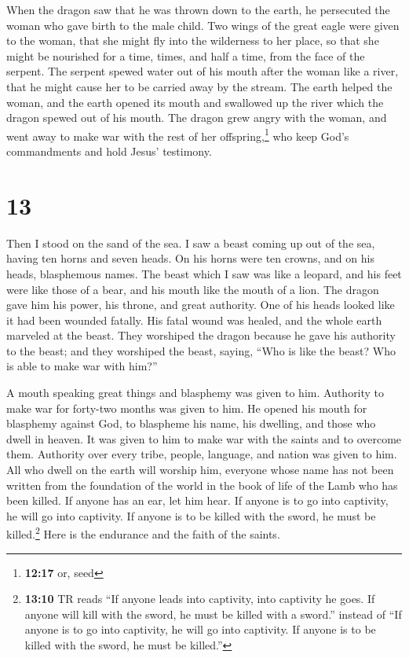  When the dragon saw that he was thrown down to the
earth, he persecuted the woman who gave birth to the male child.
 Two wings of the great eagle were given to the woman,
that she might fly into the wilderness to her place, so that she might
be nourished for a time, times, and half a time, from the face of the
serpent.  The serpent spewed water out of his mouth after
the woman like a river, that he might cause her to be carried away by
the stream.  The earth helped the woman, and the earth
opened its mouth and swallowed up the river which the dragon spewed out
of his mouth.  The dragon grew angry with the woman, and
went away to make war with the rest of her offspring,\footnote{\textbf{12:17}
  or, seed} who keep God's commandments and hold Jesus' testimony.

\hypertarget{section-12}{%
\section{13}\label{section-12}}

 Then I stood on the sand of the sea. I saw a beast coming
up out of the sea, having ten horns and seven heads. On his horns were
ten crowns, and on his heads, blasphemous names.  The
beast which I saw was like a leopard, and his feet were like those of a
bear, and his mouth like the mouth of a lion. The dragon gave him his
power, his throne, and great authority.  One of his heads
looked like it had been wounded fatally. His fatal wound was healed, and
the whole earth marveled at the beast.  They worshiped the
dragon because he gave his authority to the beast; and they worshiped
the beast, saying, ``Who is like the beast? Who is able to make war with
him?''

 A mouth speaking great things and blasphemy was given to
him. Authority to make war for forty-two months was given to him.
 He opened his mouth for blasphemy against God, to
blaspheme his name, his dwelling, and those who dwell in heaven.
 It was given to him to make war with the saints and to
overcome them. Authority over every tribe, people, language, and nation
was given to him.  All who dwell on the earth will worship
him, everyone whose name has not been written from the foundation of the
world in the book of life of the Lamb who has been killed.
 If anyone has an ear, let him hear.  If
anyone is to go into captivity, he will go into captivity. If anyone is
to be killed with the sword, he must be killed.\footnote{\textbf{13:10}
  TR reads ``If anyone leads into captivity, into captivity he goes. If
  anyone will kill with the sword, he must be killed with a sword.''
  instead of ``If anyone is to go into captivity, he will go into
  captivity. If anyone is to be killed with the sword, he must be
  killed.''} Here is the endurance and the faith of the saints.

